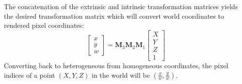 The concatenation of the extrinsic and intrinsic transformation matrices  yields the desired transformation matrix which will convert world coordinates to rendered pixel coordinates:
\begin{equation}
        \left [
    \begin{array}{c}
    x \\
    y \\
    w
    \end{array}
    \right ] 
=
\mathbf{M}_3 \mathbf{M}_2 \mathbf{M}_1 
        \left [
    \begin{array}{c}
    X \\
    Y \\
    Z \\
    1
    \end{array}
    \right ] 
    \label{eq:combined}
\end{equation}
Converting back to heterogeneous from homogeneous coordinates, the pixel indices of a point $(X, Y, Z)$ in the world will be $(\frac{x}{w}, \frac{y}{w})$.


